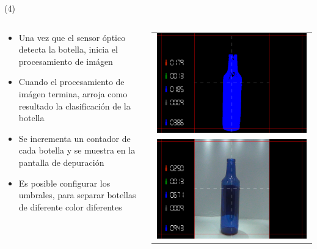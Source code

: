 \begin{frame}{ (4)}
\begin{columns}
\begin{column}{0.6\textwidth}
\begin{itemize}
\item Una vez que el sensor óptico detecta la botella, inicia el procesamiento de imágen
\item Cuando el procesamiento de imágen termina, arroja como resultado la clasificación de la botella
\item Se incrementa un contador de cada botella y se muestra en la pantalla de depuración
\item Es posible configurar los umbrales, para separar botellas de diferente color diferentes
\end{itemize}
\end{column} 
\begin{column}{0.3\textwidth}
 \begin{tabular}{c}
    \includegraphics[width=0.98\textwidth]{2022_BottleClassifier/figs/cap4_dispfinal.png}\\
    \includegraphics[width=0.98\textwidth]{2022_BottleClassifier/figs/cap4_disporiginal.png}
  \end{tabular}
\end{column} 
\end{columns} 

\end{frame}




